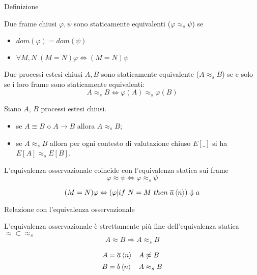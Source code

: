 \begin{frame}{Definizione}
  \begin{mydef}
    Due frame chiusi $\varphi, \psi$ sono staticamente equivalenti
    ($\varphi \approx _s \psi$) se
    \begin{itemize}
    \item $dom(\varphi) = dom(\psi)$
    \item $\forall M,N\; (M=N)\varphi \Leftrightarrow (M=N)\psi$
    \end{itemize}
  \end{mydef}

  \begin{mydef}
    Due processi estesi chiusi $A,B$ sono staticamente equivalente
    ($A \approx_s B$) se e solo se i loro frame sono staticamente
    equivalenti:
    \[ A \approx _s B \Leftrightarrow \varphi(A) \approx _s \varphi(B) \]
  \end{mydef}
\end{frame}

\begin{frame}
  \begin{mylem}
    Siano $A$, $B$ processi estesi chiusi.
    \begin{itemize}
    \item se $A \equiv B$ o $A \rightarrow B$ allora $A \approx _s B$;
    \item se $A \approx _s B$ allora per ogni contesto di valutazione
      chiuso $E[\_]$ si ha $E[A] \approx _s E[B]$.
    \end{itemize}
  \end{mylem}
  \vfill
  
  \begin{mylem}
    L'equivalenza osservazionale coincide con l'equivalenza statica
    sui frame
    \[ \varphi \approx \psi \Leftrightarrow \varphi \approx _s \psi \]
  \end{mylem}
  \pause 
  \[ (M=N)\varphi \Leftrightarrow \left( \varphi | if\ N=M\ then\
      \overline{a}\left<n\right>\right) \Downarrow a \]
\end{frame}
\begin{frame}{Relazione con l'equivalenza osservazionale}
  \begin{mypro}
    L'equivalenza osservazionale \`e strettamente pi\`u fine
    dell'equivalenza statica $\approx \subset \approx _s$
    \[ A \approx B \Rightarrow A \approx _s B \]
  \end{mypro}
  \vfill

  \begin{align*}
    A &= \overline{a}\left<n\right> & A &\not\approx B \\
    B &= \overline{b}\left<n\right> & A &\approx _s B 
  \end{align*}
\end{frame}

